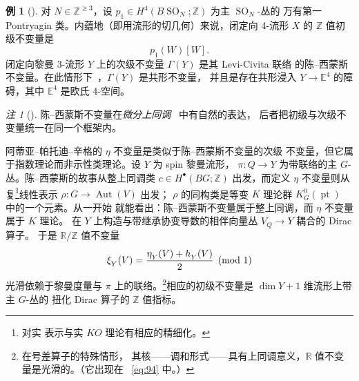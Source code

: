 \documentclass[11pt]{amsart}
\theoremstyle{definition}
\newtheorem{example}[equation]{例}
\theoremstyle{remark}
\newtheorem{remark}[equation]{注}
\theoremstyle{plain}
\numberwithin{equation}{section}
\renewcommand{\:}{\colon}
\DeclareMathOperator{\Aut}{Aut}
\newcommand{\EE}{\mathbb E}
\DeclareMathOperator{\pt}{pt}
\newcommand{\RR}{{\mathbb R}}
\newcommand{\ZZ}{{\mathbb Z}}
\DeclareRobustCommand{\mstrut}{^{\vphantom{1*\prime y\vee M}}}
\DeclareMathOperator{\SO}{SO}
\DeclareMathOperator{\sign}{sign}
\newcommand{\BSO}{B\!\SO}
\newcommand{\RZ}{\RR/\ZZ}
\newcommand{\et}[1]{\eta \mstrut _{#1}}
\newcommand{\xia}[1]{\xi \mstrut _{#1}}
\begin{document}
  \begin{example}[]\label{thm:19}
 对 $N\in \ZZ^{\ge3}$，设 $p_1\in H^4(\BSO_N;\ZZ)$ 为主 $\SO_N$-丛的
万有第一 Pontryagin 类。内蕴地（即用流形的切几何）来说，闭定向
4-流形 $X$ 的 $\ZZ$ 值初级不变量是
  \begin{equation}\label{eq:97}
     p_1(W)[W]. 
  \end{equation}
闭定向黎曼 3-流形 $Y$ 上的次级不变量 $\Gamma (Y)$ 是其 Levi-Civita 联络
的陈–西蒙斯不变量。在此情形下~\cite[\S6]{CS}，$\Gamma (Y)$ 是共形不变量，
并且是存在共形浸入 $Y\to\EE^4$ 的障碍，其中 $\EE^4$ 是欧氏 4-空间。
  \end{example}

  \begin{remark}[]\label{thm:20}
 陈–西蒙斯不变量在\emph{微分上同调}~\cite{ChS,F2,HS} 中有自然的表达，
 后者把初级与次级不变量统一在同一个框架内。
  \end{remark}

阿蒂亚–帕托迪–辛格的 $\eta$ 不变量是类似于陈–西蒙斯不变量的次级
不变量，但它属于指数理论而非示性类理论。设 $Y$ 为 spin 黎曼流形，
$\pi \:Q\to Y$ 为带联络的主 $G$-丛。陈–西蒙斯的故事从整上同调类
$c\in H^{\bullet }(BG;\ZZ)$ 出发，而定义 $\eta$ 不变量则从复\footnote{对实
表示与实 $KO$ 理论有相应的精细化。}线性表示 $\rho \:G\to\Aut(V)$ 出发；
$\rho $ 的同构类是等变 $K$ 理论群 $K^0_G(\pt)$ 中的一个元素。从一开始
就能看出：陈–西蒙斯不变量属于整上同调，而 $\eta$ 不变量属于 $K$ 理论。
在 $Y$ 上构造与带继承协变导数的相伴向量丛 $V_Q\to Y$ 耦合的 Dirac 算子。
于是 $\RZ$ 值不变量
  \begin{equation}\label{eq:98}
     \xia Y(V) = \frac{\et Y(V) + h\mstrut _Y(V)}{2}\pmod1 
  \end{equation}
光滑依赖于黎曼度量与 $\pi $ 上的联络。\footnote{在号差算子的特殊情形，
其核——调和形式——具有上同调意义，$\RR$ 值不变量是光滑的。（它出现在
~\eqref{eq:94} 中。）}相应的初级不变量是 $\dim Y+1$ 维流形上带主 $G$-丛的
扭化 Dirac 算子的 $\ZZ$ 值指标。
\end{document}

